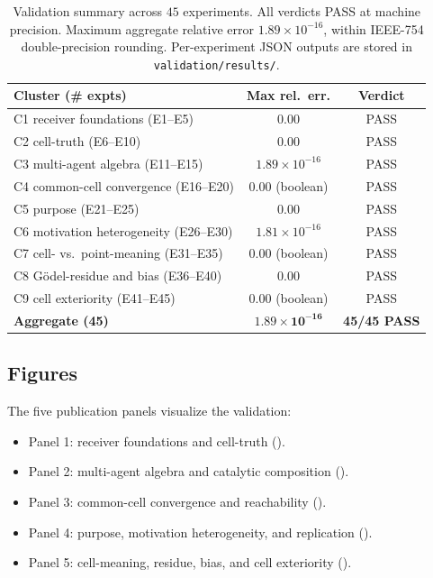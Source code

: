\documentclass[11pt,a4paper]{article}
\begin{document}
\begin{table}[h!]\centering
\begin{tabular}{lcc}
\toprule
\textbf{Cluster (\# expts)} & \textbf{Max rel.\ err.} & \textbf{Verdict}\\\midrule
C1 receiver foundations (E1--E5)     & $0.00$                       & PASS\\
C2 cell-truth (E6--E10)              & $0.00$                       & PASS\\
C3 multi-agent algebra (E11--E15)    & $1.89\times 10^{-16}$        & PASS\\
C4 common-cell convergence (E16--E20)& $0.00$ (boolean)             & PASS\\
C5 purpose (E21--E25)                & $0.00$                       & PASS\\
C6 motivation heterogeneity (E26--E30)& $1.81\times 10^{-16}$       & PASS\\
C7 cell- vs.\ point-meaning (E31--E35)& $0.00$ (boolean)             & PASS\\
C8 Gödel-residue and bias (E36--E40)  & $0.00$                       & PASS\\
C9 cell exteriority (E41--E45)        & $0.00$ (boolean)             & PASS\\\midrule
\textbf{Aggregate (45)}              & $\mathbf{1.89\times 10^{-16}}$ & \textbf{45/45 PASS}\\\bottomrule
\end{tabular}
\caption{Validation summary across $45$ experiments. All verdicts PASS
at machine precision. Maximum aggregate relative error
$1.89\times 10^{-16}$, within IEEE-754 double-precision rounding.
Per-experiment JSON outputs are stored in
\texttt{validation/results/}.}
\label{tab:validation}
\end{table}

\subsection{Figures}

The five publication panels visualize the validation:
\begin{itemize}[leftmargin=*]
\item Panel 1: receiver foundations and cell-truth ().
\item Panel 2: multi-agent algebra and catalytic composition
().
\item Panel 3: common-cell convergence and reachability
().
\item Panel 4: purpose, motivation heterogeneity, and replication
().
\item Panel 5: cell-meaning, residue, bias, and cell exteriority
().
\end{itemize}
\end{document}
